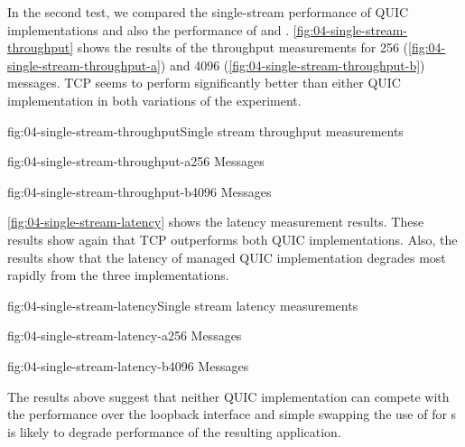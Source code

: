 
In the second test, we compared the single-stream performance of QUIC implementations and also the
performance of \TcpClient{} and \SslStream{}. \autoref{fig:04-single-stream-throughput} shows the
results of the throughput measurements for \SI{256}{\byte}
(\autoref{fig:04-single-stream-throughput-a}) and \SI{4096}{\byte}
(\autoref{fig:04-single-stream-throughput-b}) messages. TCP seems to perform significantly better
than either QUIC implementation in both variations of the experiment.

\begin{myFigure}{fig:04-single-stream-throughput}{Single stream throughput measurements}
\begin{mySubfigure}{0.49\linewidth}{fig:04-single-stream-throughput-a}{\SI{256}{\byte} Messages}
\footnotesize

\end{mySubfigure}
\begin{mySubfigure}{0.49\linewidth}{fig:04-single-stream-throughput-b}{\SI{4096}{\byte} Messages}
\footnotesize

\end{mySubfigure}
\end{myFigure}

\autoref{fig:04-single-stream-latency} shows the latency measurement results. These results show
again that TCP outperforms both QUIC implementations. Also, the results show that the latency of
managed QUIC implementation degrades most rapidly from the three implementations.

\begin{myFigure}{fig:04-single-stream-latency}{Single stream latency measurements}
\begin{mySubfigure}{0.49\linewidth}{fig:04-single-stream-latency-a}{\SI{256}{\byte} Messages}
\footnotesize

\end{mySubfigure}
\begin{mySubfigure}{0.49\linewidth}{fig:04-single-stream-latency-b}{\SI{4096}{\byte} Messages}
\footnotesize

\end{mySubfigure}
\end{myFigure}

The results above suggest that neither QUIC implementation can compete with the \SslStream{}
performance over the loopback interface and simple swapping the use of \SslStream{} for
\QuicStream{}s is likely to degrade performance of the resulting application.


